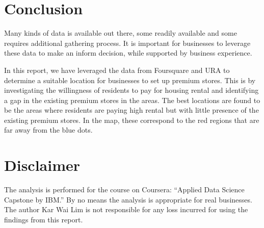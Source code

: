 \documentclass[oneside,11pt]{article}
\begin{document}
\section{Conclusion}

Many kinds of data is available out there, some readily available
and some requires additional gathering process. It is important 
for businesses to leverage these data to make an inform decision,
while supported by business experience.

In this report, we have leveraged the data from Foursquare and URA
to determine a suitable location for businesses to set up premium stores.
This is by investigating the willingness of residents to pay 
for housing rental and identifying a gap in the existing premium stores
in the areas. The best locations are found to be the areas where residents 
are paying high rental but with little presence of the existing premium stores.
In the map, these correspond to the red regions that are far away from the
blue dots.


\section*{Disclaimer}

The analysis is performed for the course on Coursera: ``Applied Data Science Capstone by IBM.'' By no means the analysis is appropriate for real 
businesses. The author Kar Wai Lim is not responsible for any loss incurred
for using the findings from this report.
\end{document}
